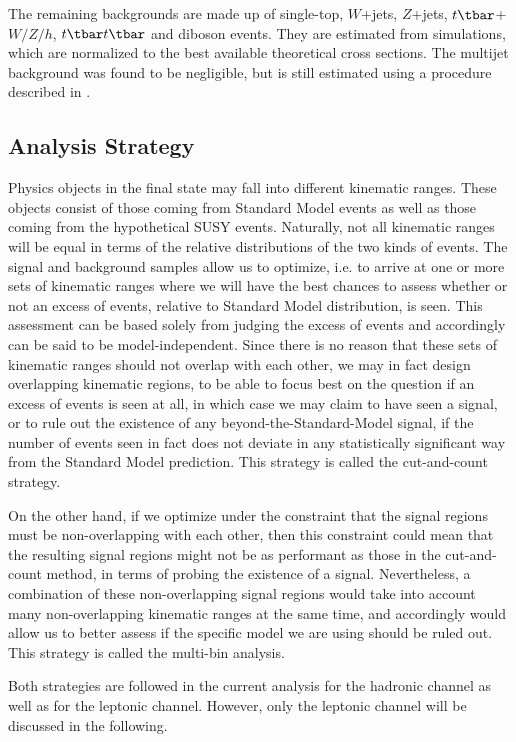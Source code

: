 The remaining backgrounds are made up of single-top, $W$+jets, $Z$+jets,
$t\tbar$+$W/Z/h$, $t\tbar t\tbar$ and diboson events. They are estimated from
simulations, which are normalized to the best available theoretical cross
sections. The multijet background was found to be negligible, but is still
estimated using a procedure described in \cite{Aad:2012fqa}.

\subsection{Analysis Strategy}\label{s:mbstra}

Physics objects in the final state may fall into different kinematic ranges.
These objects consist of those coming from Standard Model events as well as
those coming from the hypothetical SUSY events. Naturally, not all kinematic
ranges will be equal in terms of the relative distributions of the two kinds of
events. The signal and background samples allow us to optimize, i.e. to arrive
at one or more sets of kinematic ranges where we will have the best chances to
assess whether or not an excess of events, relative to Standard Model
distribution, is seen. This assessment can be based solely from judging the
excess of events and accordingly can be said to be model-independent. Since
there is no reason that these sets of kinematic ranges should not overlap with
each other, we may in fact design overlapping kinematic regions, to be able to
focus best on the question if an excess of events is seen at all, in which case
we may claim to have seen a signal, or to rule out the existence of any
beyond-the-Standard-Model signal, if the number of events seen in fact does not
deviate in any statistically significant way from the Standard Model
prediction. This strategy is called the cut-and-count strategy.

On the other hand, if we optimize under the constraint that the signal regions
must be non-overlapping with each other, then this constraint could mean that
the resulting signal regions might not be as performant as those in the
cut-and-count method, in terms of probing the existence of a signal.
Nevertheless, a combination of these non-overlapping signal regions would take
into account many non-overlapping kinematic ranges at the same time, and
accordingly would allow us to better assess if the specific model we are using
should be ruled out. This strategy is called the multi-bin analysis.

Both strategies are followed in the current analysis for the hadronic channel
as well as for the leptonic channel. However, only the leptonic channel will be
discussed in the following.

